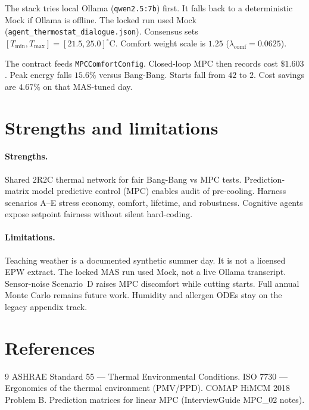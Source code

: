\documentclass[11pt]{article}
\begin{document}
The stack tries local Ollama (\texttt{qwen2.5:7b}) first.
It falls back to a deterministic Mock if Ollama is offline.
The locked run used Mock
(\texttt{agent\_thermostat\_dialogue.json}).
Consensus sets
$[T_{\min},T_{\max}]=[21.5,25.0]^\circ\mathrm{C}$.
Comfort weight scale is $1.25$
($\lambda_{\mathrm{comf}}=0.0625$).

The contract feeds \texttt{MPCComfortConfig}.
Closed-loop MPC then records cost $\$1.603$.
Peak energy falls $15.6\%$ versus Bang-Bang.
Starts fall from $42$ to $2$.
Cost savings are $4.67\%$ on that MAS-tuned day.

\section{Strengths and limitations}
\paragraph{Strengths.}
Shared 2R2C thermal network for fair Bang-Bang vs MPC tests.
Prediction-matrix model predictive control (MPC) enables audit of pre-cooling.
Harness scenarios A--E stress economy, comfort, lifetime, and robustness.
Cognitive agents expose setpoint fairness without silent hard-coding.

\paragraph{Limitations.}
Teaching weather is a documented synthetic summer day.
It is not a licensed EPW extract.
The locked MAS run used Mock, not a live Ollama transcript.
Sensor-noise Scenario~D raises MPC discomfort while cutting starts.
Full annual Monte Carlo remains future work.
Humidity and allergen ODEs stay on the legacy appendix track.

\section*{References}
\begin{thebibliography}{9}
 ASHRAE Standard 55 --- Thermal Environmental Conditions.
 ISO 7730 --- Ergonomics of the thermal environment (PMV/PPD).
 COMAP HiMCM 2018 Problem B.
 Prediction matrices for linear MPC (InterviewGuide MPC\_02 notes).
\end{thebibliography}
\end{document}
